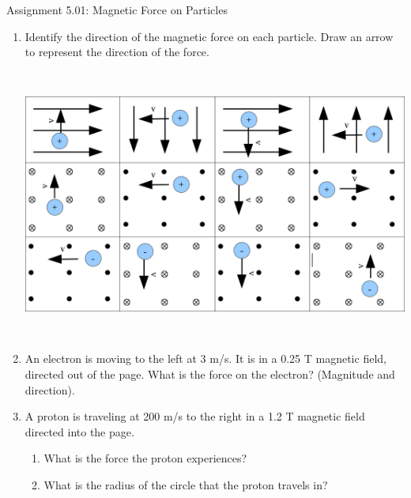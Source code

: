 \documentclass[letterpaper, 12pt]{article}
\begin{document}
	

	
\begin{center}Assignment 5.01: Magnetic Force on Particles
\end{center}

\begin{enumerate}
	\item  Identify the direction of the magnetic force on each particle.  Draw an arrow to represent the direction of the force.
	
	\includegraphics[height=3.5in]{../particlesinmagneticfields.png}
	
	\item An electron is moving to the left at 3 m/s.  It is in a 0.25 T magnetic field, directed out of the page. What is the force on the electron?  (Magnitude and direction).
	\vspace{1in}

	\item A proton is traveling at 200 m/s to the right in a 1.2 T magnetic field directed into the page.  
		\begin{enumerate}
			\item What is the force the proton experiences?
			\vspace{.75in}
			\item What is the radius of the circle that the proton travels in?
		\end{enumerate}
	
	\vspace{.9in}
	

\end{enumerate}
\end{document}
